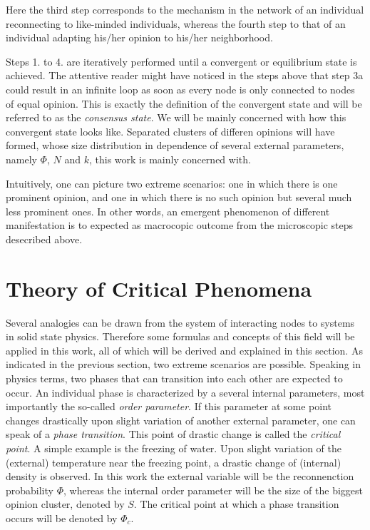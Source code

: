 \documentclass[11pt]{article}
\begin{document}
Here the third step corresponds to the mechanism in the network of an individual reconnecting to like-minded individuals, whereas the fourth step to that of an individual adapting his/her opinion to his/her neighborhood. 

Steps 1. to 4. are iteratively performed until a convergent or equilibrium state is achieved. The attentive reader might have noticed in the steps above that step 3a could result in an infinite loop as soon as every node is only connected to nodes of equal opinion. This is exactly the definition of the convergent state and will be referred to as the \textit{consensus state}. We will be mainly concerned with how this convergent state looks like. Separated clusters of differen opinions will have formed, whose size distribution in dependence of several external parameters, namely $\Phi$, $N$ and $k$, this work is mainly concerned with.

Intuitively, one can picture two extreme scenarios: one in which there is one prominent opinion, and one in which there is no such opinion but several much less prominent ones. In other words, an emergent phenomenon of different manifestation is to expected as macrocopic outcome from the microscopic steps desecribed above.

\section{Theory of Critical Phenomena}

Several analogies can be drawn from the system of interacting nodes to systems in solid state physics. Therefore some formulas and concepts of this field will be applied in this work, all of which will be derived and explained in this section. As indicated in the previous section, two extreme scenarios are possible. Speaking in physics terms, two phases that can transition into each other are expected to occur. An individual phase is characterized by a several internal parameters, most importantly the so-called \textit{order parameter}. If this parameter at some point changes drastically upon slight variation of another external parameter, one can speak of a \textit{phase transition}. This point of drastic change is called the \textit{critical point}. A simple example is the freezing of water. Upon slight variation of the (external) temperature near the freezing point, a drastic change of (internal) density is observed. In this work the external variable will be the reconnenction probability $\Phi$, whereas the internal order parameter will be the size of the biggest opinion cluster, denoted by $S$. The critical point at which a phase transition occurs will be denoted by $\Phi_c$.
\end{document}
